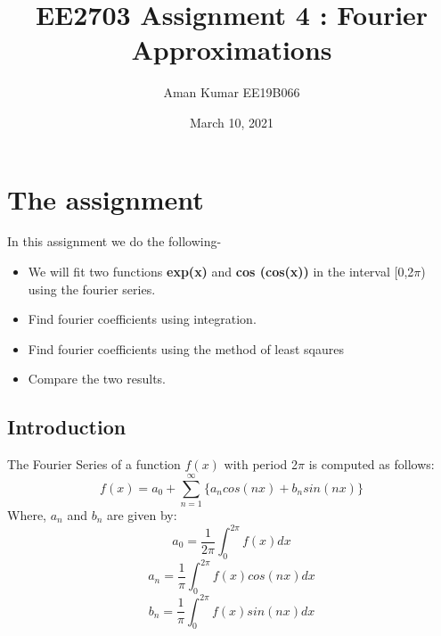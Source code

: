 \documentclass[11pt, a4paper]{article}
\title{EE2703 Assignment 4 : Fourier Approximations}
\author{Aman Kumar EE19B066}
\date{March 10, 2021}
\begin{document}
\maketitle
\section{The assignment}
In this assignment we do the following-
\begin{itemize}
    \item We will fit two functions \textbf{exp(x)} and \textbf{cos (cos(x))} in the interval [0,2$\pi$) using the fourier series.
    \item Find fourier coefficients using integration.
    \item Find fourier coefficients using the method of least sqaures
    \item Compare the two results.
\end{itemize}
    \subsection{Introduction}
    The Fourier Series of a function $f(x)$ with period 2$\pi$ is computed as follows:
    \begin{equation*}
        f(x) = a_{0} + \sum_{n=1}^{\infty} \{a_{n}cos(nx) + b_{n}sin(nx)\}
    \end{equation*}
    Where, $a_n$ and $b_n$ are given by:
    \begin{equation*}
        a_{0} = \frac{1}{2\pi}\int_{0}^{2\pi} f(x)dx
    \end{equation*}
    \begin{equation*}
        a_{n} = \frac{1}{\pi}\int_{0}^{2\pi} f(x)cos(nx)dx
    \end{equation*}
    \begin{equation*}
        b_{n} = \frac{1}{\pi}\int_{0}^{2\pi} f(x)sin(nx)dx
    \end{equation*}
\end{document}
